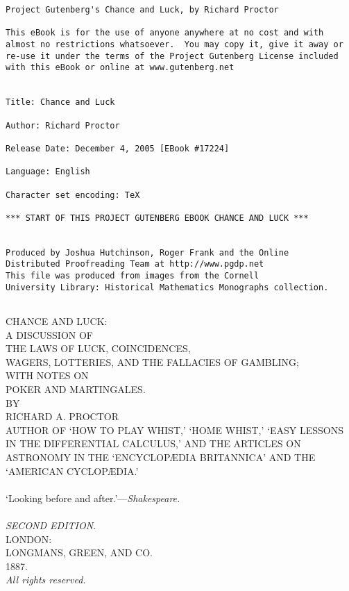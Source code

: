 \documentclass[letterpaper,12pt,oneside,openany]{memoir}
\begin{document}
\thispagestyle{empty}
\small
\begin{verbatim}
Project Gutenberg's Chance and Luck, by Richard Proctor

This eBook is for the use of anyone anywhere at no cost and with
almost no restrictions whatsoever.  You may copy it, give it away or
re-use it under the terms of the Project Gutenberg License included
with this eBook or online at www.gutenberg.net


Title: Chance and Luck

Author: Richard Proctor

Release Date: December 4, 2005 [EBook #17224]

Language: English

Character set encoding: TeX

*** START OF THIS PROJECT GUTENBERG EBOOK CHANCE AND LUCK ***


Produced by Joshua Hutchinson, Roger Frank and the Online
Distributed Proofreading Team at http://www.pgdp.net
This file was produced from images from the Cornell
University Library: Historical Mathematics Monographs collection.


\end{verbatim}
\normalsize
\newpage

\pagestyle{empty}

\begin{titlingpage}
\begin{center}
\vspace*{1cm}
{\Huge CHANCE AND LUCK:}\\
\bigskip
{\small A DISCUSSION OF}\\
\medskip
{\large THE LAWS OF LUCK, COINCIDENCES,\\
WAGERS, LOTTERIES, AND THE FALLACIES OF GAMBLING;}\\
\bigskip
{\small WITH NOTES ON}\\
\medskip
{\large POKER AND MARTINGALES.}\\
\vspace*{2cm}
{\small BY}\\
\smallskip
{\large RICHARD A. PROCTOR}\\
\bigskip
{\tiny AUTHOR OF `HOW TO PLAY WHIST,' `HOME WHIST,'
`EASY LESSONS IN THE DIFFERENTIAL CALCULUS,'
AND THE ARTICLES ON ASTRONOMY IN THE `ENCYCLOP{\AE}DIA BRITANNICA'
AND THE `AMERICAN CYCLOP{\AE}DIA.'}\\
\vspace*{2cm}
\makebox[1in]{\hrulefill}\\
\smallskip
`Looking before and after.'---\textit{Shakespeare.}\\
\makebox[1in]{\hrulefill}\\
\vspace*{2cm}
\textit{SECOND EDITION}.\\
\bigskip
{\large LONDON:\\
LONGMANS, GREEN, AND CO.\\
1887.}\\
\medskip
{\small \emph{All rights reserved.}}
\end{center}
\end{titlingpage}
\end{document}
